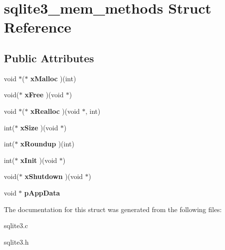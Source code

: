 \hypertarget{structsqlite3__mem__methods}{}\section{sqlite3\+\_\+mem\+\_\+methods Struct Reference}
\label{structsqlite3__mem__methods}
\subsection*{Public Attributes}
\begin{DoxyCompactItemize}
\item 
void $\ast$($\ast$ {\bfseries x\+Malloc} )(int)\hypertarget{structsqlite3__mem__methods_acb9151cf501c851b61ab6b378832b159}{}\label{structsqlite3__mem__methods_acb9151cf501c851b61ab6b378832b159}

\item 
void($\ast$ {\bfseries x\+Free} )(void $\ast$)\hypertarget{structsqlite3__mem__methods_aa2e7fe8d030adaa17fd23a44fec1eca1}{}\label{structsqlite3__mem__methods_aa2e7fe8d030adaa17fd23a44fec1eca1}

\item 
void $\ast$($\ast$ {\bfseries x\+Realloc} )(void $\ast$, int)\hypertarget{structsqlite3__mem__methods_a5bb7e62164d0934888473c618c61dc77}{}\label{structsqlite3__mem__methods_a5bb7e62164d0934888473c618c61dc77}

\item 
int($\ast$ {\bfseries x\+Size} )(void $\ast$)\hypertarget{structsqlite3__mem__methods_a6c68275b577d66ae659ef30344c8f86c}{}\label{structsqlite3__mem__methods_a6c68275b577d66ae659ef30344c8f86c}

\item 
int($\ast$ {\bfseries x\+Roundup} )(int)\hypertarget{structsqlite3__mem__methods_a8b3f0d1ddeb498c4aaf9bbce5b92a268}{}\label{structsqlite3__mem__methods_a8b3f0d1ddeb498c4aaf9bbce5b92a268}

\item 
int($\ast$ {\bfseries x\+Init} )(void $\ast$)\hypertarget{structsqlite3__mem__methods_ad0997b548928358d655000b6ac825cf4}{}\label{structsqlite3__mem__methods_ad0997b548928358d655000b6ac825cf4}

\item 
void($\ast$ {\bfseries x\+Shutdown} )(void $\ast$)\hypertarget{structsqlite3__mem__methods_a6f48100692bd935d7f3dbb8c701ab6ca}{}\label{structsqlite3__mem__methods_a6f48100692bd935d7f3dbb8c701ab6ca}

\item 
void $\ast$ {\bfseries p\+App\+Data}\hypertarget{structsqlite3__mem__methods_af91b7adfa1f6aace0b129bac800bd444}{}\label{structsqlite3__mem__methods_af91b7adfa1f6aace0b129bac800bd444}

\end{DoxyCompactItemize}


The documentation for this struct was generated from the following files\+:\begin{DoxyCompactItemize}
\item 
sqlite3.\+c\item 
sqlite3.\+h\end{DoxyCompactItemize}
